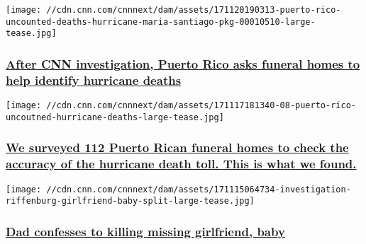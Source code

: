 \href{/2017/11/21/health/pesquera-responds-puerto-rico-death-count-invs/index.html}{}

\texttt{[image: //cdn.cnn.com/cnnnext/dam/assets/171120190313-puerto-rico-uncounted-deaths-hurricane-maria-santiago-pkg-00010510-large-tease.jpg]}

\hypertarget{after-cnn-investigation-puerto-rico-asks-funeral-homes-to-help-identify-hurricane-deaths}{%
\subsubsection{\texorpdfstring{\href{/2017/11/21/health/pesquera-responds-puerto-rico-death-count-invs/index.html}{After
CNN investigation, Puerto Rico asks funeral homes to help identify
hurricane
deaths}}{After CNN investigation, Puerto Rico asks funeral homes to help identify hurricane deaths}}\label{after-cnn-investigation-puerto-rico-asks-funeral-homes-to-help-identify-hurricane-deaths}}

\href{/2017/11/20/health/hurricane-maria-uncounted-deaths-invs/index.html}{}

\texttt{[image: //cdn.cnn.com/cnnnext/dam/assets/171117181340-08-puerto-rico-uncoutned-hurricane-deaths-large-tease.jpg]}

\hypertarget{we-surveyed-112-puerto-rican-funeral-homes-to-check-the-accuracy-of-the-hurricane-death-toll-this-is-what-we-found}{%
\subsubsection{\texorpdfstring{\href{/2017/11/20/health/hurricane-maria-uncounted-deaths-invs/index.html}{We
surveyed 112 Puerto Rican funeral homes to check the accuracy of the
hurricane death toll. This is what we
found.}}{We surveyed 112 Puerto Rican funeral homes to check the accuracy of the hurricane death toll. This is what we found.}}\label{we-surveyed-112-puerto-rican-funeral-homes-to-check-the-accuracy-of-the-hurricane-death-toll-this-is-what-we-found}}

\href{/2017/11/16/us/cold-case-confession-invs/index.html}{}

\texttt{[image: //cdn.cnn.com/cnnnext/dam/assets/171115064734-investigation-riffenburg-girlfriend-baby-split-large-tease.jpg]}

\hypertarget{dad-confesses-to-killing-missing-girlfriend-baby}{%
\subsubsection{\texorpdfstring{\href{/2017/11/16/us/cold-case-confession-invs/index.html}{Dad
confesses to killing missing girlfriend,
baby}}{Dad confesses to killing missing girlfriend, baby}}\label{dad-confesses-to-killing-missing-girlfriend-baby}}

